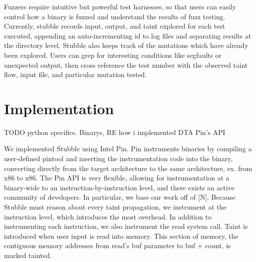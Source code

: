 \documentclass[11pt,expanded,copyright]{fsuthesis}
\begin{document}
Fuzzers require intuitive but powerful test harnesses, so that users can easily control how a binary is fuzzed and understand the results of fuzz testing. Currently, stubble records input, output, and taint explored for each test executed, appending an auto-incrementing id to log files and separating results at the directory level. Stubble also keeps track of the mutations which have already been explored. Users can grep for interesting conditions like segfaults or unexpected output, then cross reference the test number with the observed taint flow, input file, and particular mutation tested.


\section{Implementation}

TODO
python specifics. Binarys, RE
how i implemented DTA
Pin's API

We implemented Stubble using Intel Pin. Pin instruments binaries by compiling a user-defined pintool and inserting the instrumentation code into the binary, converting directly from the target architecture to the same architecture, ex. from x86 to x86. The Pin API is very flexible, allowing for instrumentation at a binary-wide to an instruction-by-instruction level, and there exists an active community of developers. In particular, we base our work off of [N]. Because Stubble must reason about every taint propagation, we instrument at the instruction level, which introduces the most overhead. In addition to instrumenting each instruction, we also instrument the read system call. Taint is introduced when user input is read into memory. This section of memory, the contiguous memory addresses from read's buf parameter to buf + count, is marked tainted. 
\end{document}
